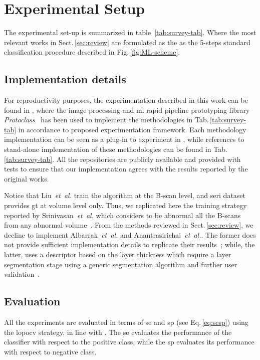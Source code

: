 \graphicspath{ {./content/method/figures/} }

\section{Experimental Setup}\label{sec:exp}

The experimental set-up is summarized in table~\ref{tab:survey-tab}.
Where the most relevant works in Sect.\,\ref{sec:review} are formulated as the as the 5-steps standard classification procedure described in Fig.\,\ref{fig:ML-scheme}.



\subsection{Implementation details}\label{sec:exp:implementation}
For reproductivity purposes, the experimentation described in this work can be found in \cite{rethinopaty20016apr-repoICPR},
where the image processing and \gls{ml} rapid pipeline prototyping library \emph{Protoclass}~\cite{protoclass2016apr-repoICPR} has been used to implement the methodologies in Tab.\,\ref{tab:survey-tab} in accordance to proposed experimentation framework.
Each methodology implementation can be seen as a plug-in to experiment in \cite{rethinopaty20016apr-repoICPR}, while references to stand-alone implementation of these methodologies can be found in Tab.\,\ref{tab:survey-tab}.
All the repositories are publicly available and provided with tests to ensure that our implementation agrees with the results reported by the original works.

Notice that Liu~\emph{et~al.} train the algorithm at the B-scan level, and \gls{seri} dataset provides \gls{gt} at volume level only.
Thus, we replicated here the training strategy reported by Srinivasan~\emph{et~al.} which considers to be abnormal all the B-scans from any abnormal volume~\cite{Srinivasan2014}.
From the methods reviewed in Sect.\,\ref{sec:review}, we decline to implement Albarrak~\emph{et~al.} and Anantrasirichai~\textit{et~al.}.
The former does not provide sufficient implementation details to replicate their results~\cite{albarrak2013age};
while, the latter, uses a descriptor based on the layer thickness which require a layer segmentation stage using a generic segmentation algorithm and further user validation~\cite{anantrasirichai2013svm}.


\subsection{Evaluation}\label{sec:exp:evaluation}
All the experiments are evaluated in terms of \gls{se} and \gls{sp} (see Eq.\,\ref{eq:sesp}) using the \gls{lopocv} strategy, in line with \cite{Lemaintre2015miccaiOCT}.
The \gls{se} evaluates the performance of the classifier with respect to the positive class, while the \gls{sp} evaluates its performance with respect to negative class.

